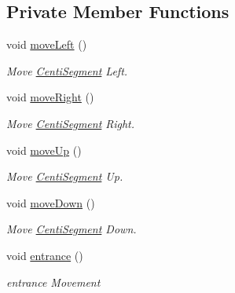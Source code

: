 \subsection*{Private Member Functions}
\begin{DoxyCompactItemize}
\item 
\mbox{\label{class_centi_segment_ab6cdc9580f671fb06e62df3d78631125}} 
void \mbox{\hyperlink{class_centi_segment_ab6cdc9580f671fb06e62df3d78631125}{move\+Left}} ()
\begin{DoxyCompactList}\small\item\em Move \mbox{\hyperlink{class_centi_segment}{Centi\+Segment}} Left. \end{DoxyCompactList}\item 
\mbox{\label{class_centi_segment_aec29caa7fc59fa7db1661fb9dfc9c62a}} 
void \mbox{\hyperlink{class_centi_segment_aec29caa7fc59fa7db1661fb9dfc9c62a}{move\+Right}} ()
\begin{DoxyCompactList}\small\item\em Move \mbox{\hyperlink{class_centi_segment}{Centi\+Segment}} Right. \end{DoxyCompactList}\item 
\mbox{\label{class_centi_segment_a7238c16d6e8af24003f3d7321797c458}} 
void \mbox{\hyperlink{class_centi_segment_a7238c16d6e8af24003f3d7321797c458}{move\+Up}} ()
\begin{DoxyCompactList}\small\item\em Move \mbox{\hyperlink{class_centi_segment}{Centi\+Segment}} Up. \end{DoxyCompactList}\item 
\mbox{\label{class_centi_segment_ac0d964dda7b0a21b08aeace080235dec}} 
void \mbox{\hyperlink{class_centi_segment_ac0d964dda7b0a21b08aeace080235dec}{move\+Down}} ()
\begin{DoxyCompactList}\small\item\em Move \mbox{\hyperlink{class_centi_segment}{Centi\+Segment}} Down. \end{DoxyCompactList}\item 
\mbox{\label{class_centi_segment_ad6437e55882b585549c94ef33fd1b80c}} 
void \mbox{\hyperlink{class_centi_segment_ad6437e55882b585549c94ef33fd1b80c}{entrance}} ()
\begin{DoxyCompactList}\small\item\em entrance Movement \end{DoxyCompactList}\end{DoxyCompactItemize}
